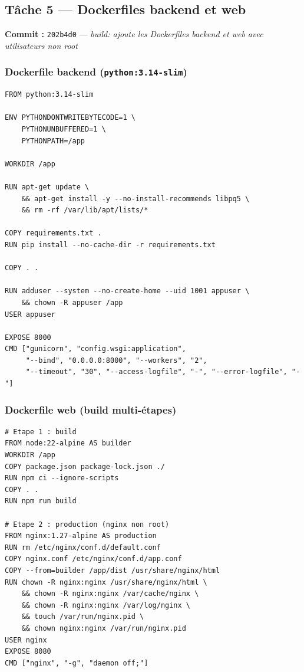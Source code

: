 \documentclass[11pt,a4paper]{article}
\begin{document}
\subsection{Tâche 5 --- Dockerfiles backend et web}

\textbf{Commit :} \texttt{202b4d0} --- \textit{build: ajoute les Dockerfiles backend et web
avec utilisateurs non root}

\subsubsection*{Dockerfile backend (\texttt{python:3.14-slim})}

\begin{lstlisting}[caption={backend/Dockerfile}]
FROM python:3.14-slim

ENV PYTHONDONTWRITEBYTECODE=1 \
    PYTHONUNBUFFERED=1 \
    PYTHONPATH=/app

WORKDIR /app

RUN apt-get update \
    && apt-get install -y --no-install-recommends libpq5 \
    && rm -rf /var/lib/apt/lists/*

COPY requirements.txt .
RUN pip install --no-cache-dir -r requirements.txt

COPY . .

RUN adduser --system --no-create-home --uid 1001 appuser \
    && chown -R appuser /app
USER appuser

EXPOSE 8000
CMD ["gunicorn", "config.wsgi:application",
     "--bind", "0.0.0.0:8000", "--workers", "2",
     "--timeout", "30", "--access-logfile", "-", "--error-logfile", "-"]
\end{lstlisting}

\subsubsection*{Dockerfile web (build multi-étapes)}

\begin{lstlisting}[caption={web/Dockerfile --- node:22-alpine puis nginx:1.27-alpine}]
# Etape 1 : build
FROM node:22-alpine AS builder
WORKDIR /app
COPY package.json package-lock.json ./
RUN npm ci --ignore-scripts
COPY . .
RUN npm run build

# Etape 2 : production (nginx non root)
FROM nginx:1.27-alpine AS production
RUN rm /etc/nginx/conf.d/default.conf
COPY nginx.conf /etc/nginx/conf.d/app.conf
COPY --from=builder /app/dist /usr/share/nginx/html
RUN chown -R nginx:nginx /usr/share/nginx/html \
    && chown -R nginx:nginx /var/cache/nginx \
    && chown -R nginx:nginx /var/log/nginx \
    && touch /var/run/nginx.pid \
    && chown nginx:nginx /var/run/nginx.pid
USER nginx
EXPOSE 8080
CMD ["nginx", "-g", "daemon off;"]
\end{lstlisting}
\end{document}

